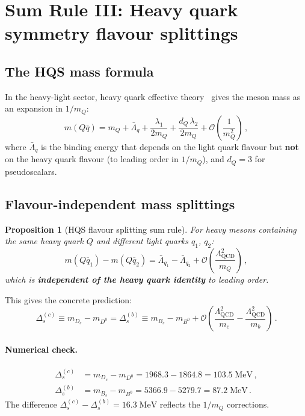 \documentclass[11pt,a4paper]{article}
\newcommand{\QCD}{\ensuremath{\mathrm{QCD}}}
\newcommand{\Lbar}{\bar{\Lambda}}
\newcommand{\LQCD}{\Lambda_{\QCD}}
\newcommand{\Ord}{\mathcal{O}}
\theoremstyle{plain}
\newtheorem{proposition}{Proposition}
\begin{document}
\section{Sum Rule III: Heavy quark symmetry flavour splittings}
\label{sec:hqs}

\subsection{The HQS mass formula}

In the heavy-light sector, heavy quark effective
theory~\cite{ManoharWise2000} gives the meson mass as an expansion
in $1/m_Q$:
\begin{equation}\label{eq:hqet}
  m(Q\bar{q}) = m_Q + \Lbar_q + \frac{\lambda_1}{2m_Q}
  + \frac{d_Q\,\lambda_2}{2m_Q} + \Ord\!\left(\frac{1}{m_Q^2}\right)\,,
\end{equation}
where $\Lbar_q$ is the binding energy that depends on the light quark
flavour but \textbf{not} on the heavy quark flavour (to leading order
in $1/m_Q$), and $d_Q = 3$ for pseudoscalars.

\subsection{Flavour-independent mass splittings}

\begin{proposition}[HQS flavour splitting sum rule]
\label{prop:hqs-splitting}
For heavy mesons containing the same heavy quark $Q$ and different
light quarks $q_1$, $q_2$:
\begin{equation}\label{eq:hqs-splitting}
  \boxed{m(Q\bar{q}_1) - m(Q\bar{q}_2) = \Lbar_{q_1} - \Lbar_{q_2}
  + \Ord\!\left(\frac{\LQCD^2}{m_Q}\right)\,,}
\end{equation}
which is \textbf{independent of the heavy quark identity} to leading
order.
\end{proposition}

This gives the concrete prediction:
\begin{equation}\label{eq:delta-s}
  \Delta_s^{(c)} \equiv m_{D_s} - m_{D^0}
  = \Delta_s^{(b)} \equiv m_{B_s} - m_{B^0}
  + \Ord\!\left(\frac{\LQCD^2}{m_c} - \frac{\LQCD^2}{m_b}\right)\,.
\end{equation}

\paragraph{Numerical check.}
\begin{align}
  \Delta_s^{(c)} &= m_{D_s} - m_{D^0} = 1968.3 - 1864.8 = 103.5\;\text{MeV}\,, \\
  \Delta_s^{(b)} &= m_{B_s} - m_{B^0} = 5366.9 - 5279.7 = 87.2\;\text{MeV}\,.
\end{align}
The difference $\Delta_s^{(c)} - \Delta_s^{(b)} = 16.3\;\text{MeV}$
reflects the $1/m_Q$ corrections.
\end{document}
